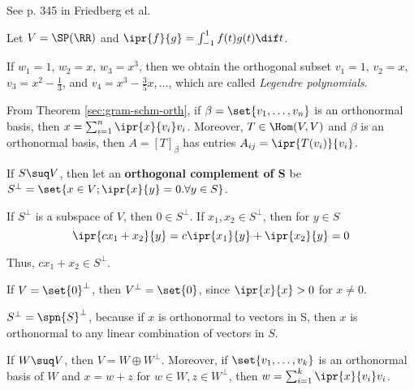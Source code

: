 \documentclass[11pt]{scrartcl}
\begin{document}
\begin{example}

  See p. 345 in Friedberg et al.

  Let $V = \SP(\RR)$ and $\ipr{f}{g} = \int_{-1}^1f(t)g(t)\dif t$.

  If $w_1=1$, $w_2 = x$, $w_3 = x^3$, then we obtain the orthogonal
  subset $v_1 = 1$, $v_2 = x$, $v_3 = x^2 - \frac{1}{3}$, and
  $v_4 = x^3-\frac{3}{5}x, \dots$, which are called \textit{Legendre
    polynomials}.
\end{example}
\begin{remark}
  \hfill

  From Theorem \ref{sec:gram-schm-orth}, if
  $\beta = \set{v_1, \dots, v_{n}}$ is an orthonormal basis, then
  $x = \sum_{i=1}^{n}\ipr{x}{v_i}v_i$. Moreover, $T \in \Hom(V,V)$ and
  $\beta$ is an orthonormal basis, then $A = [T]_{\beta}$ has entries $A_{ij} = \ipr {T(v_i)}{v_i}$.
\end{remark}

\begin{definition}
  If $S \suq V$, then let an \textbf{orthogonal complement of S} be
  $S^{\bot} = \set{x\in V; \ipr{x}{y} = 0.\forall y\in S}$.
\end{definition}
\begin{remark}
  If $S^{\bot}$ is a subspace of $V$, then $0\in S^{\bot}$. If
  $x_1, x_2 \in S^{\bot}$, then for $y\in S$
  \[
    \ipr{cx_1+x_2}{y} = c\ipr{x_1}{y} + \ipr{x_{2}}{y} = 0
  \]

  Thus, $cx_1+ x_2\in S^{\bot}$.
\end{remark}

\begin{example}
If $V = \set{0}^{\bot}$, then $V^{\bot} = \set{0}$, since $\ipr{x}{x}> 0$ for $x\neq 0$.
\end{example}

\begin{remark}
  $S^{\bot} = \spn{S}^{\bot}$, because if $x$ is orthonormal to
  vectors in S, then $x$ is orthonormal to any linear combination of vectors in $S$.
\end{remark}

\begin{theorem}
  If $W\suq V$, then $V = W \oplus W^{\bot}$. Moreover, if
  $\set{v_1,\dots, v_k}$ is an orthonormal basis of $W$ and $x = w+ z$
  for $w\in W, z \in W^{\bot}$, then $w = \sum_{i=1}^k\ipr{x}{v_i}v_i$.
\end{theorem}
\end{document}
